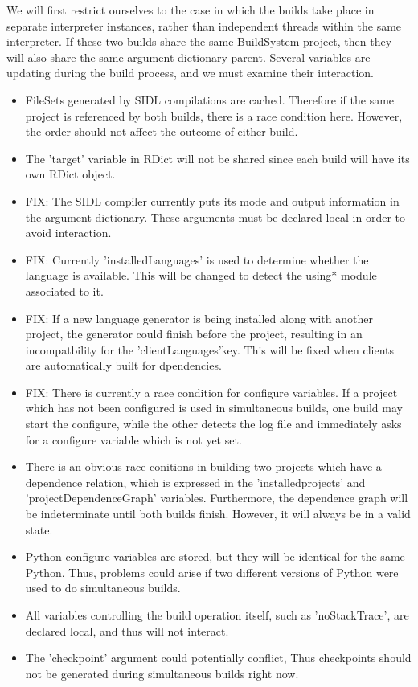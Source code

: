 We will first restrict ourselves to the case in which the builds take place in separate interpreter instances, rather
than independent threads within the same interpreter. If these two builds share the same BuildSystem project, then they
will also share the same argument dictionary parent. Several variables are updating during the build process, and we
must examine their interaction.
\begin{itemize}
  \item FileSets generated by SIDL compilations are cached. Therefore if the same project is referenced by both builds,
there is a race condition here. However, the order should not affect the outcome of either build.

  \item The 'target' variable in RDict will not be shared since each build will have its own RDict object.

  \item FIX: The SIDL compiler currently puts its mode and output information in the argument dictionary. These arguments
must be declared local in order to avoid interaction.

  \item FIX: Currently 'installedLanguages' is used to determine whether the language is available. This will be changed
to detect the using* module associated to it.

  \item FIX: If a new language generator is being installed along with another project, the generator could finish
before the project, resulting in an incompatbility for the 'clientLanguages'key. This will be fixed when clients are
automatically built for dpendencies.

  \item FIX: There is currently a race condition for configure variables. If a project which has not been configured is
used in simultaneous builds, one build may start the configure, while the other detects the log file and immediately
asks for a configure variable which is not yet set.

  \item There is an obvious race conitions in building two projects which have a dependence relation, which is expressed
in the 'installedprojects' and 'projectDependenceGraph' variables. Furthermore, the dependence graph will be
indeterminate until both builds finish. However, it will always be in a valid state.

  \item Python configure variables are stored, but they will be identical for the same Python. Thus, problems could
arise if two different versions of Python were used to do simultaneous builds.

  \item All variables controlling the build operation itself, such as 'noStackTrace', are declared local, and thus will
not interact.

  \item The 'checkpoint' argument could potentially conflict, Thus checkpoints should not be generated during
simultaneous builds right now.

\end{itemize}

